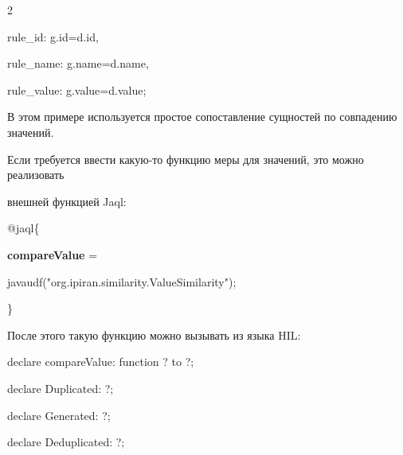 \begin{multicols}{2}
{\noindent

    \hspace*{3pt}rule\_id: g.id\;=\;d.id,



\noindent

    \hspace*{3pt}rule\_name: g.name\;=\;d.name,



\noindent

    \hspace*{3pt}rule\_value: g.value\;=\;d.value;

    }



  В этом примере используется простое сопо\-став\-ле\-ние сущностей по совпадению значений.

Если требуется ввести какую-то функцию меры для значений, это можно реализовать

внешней функцией Jaql:

{\sf



\noindent

  @jaql\{



\noindent

  {\textbf{compareValue}} =



  javaudf("org.ipiran.similarity.ValueSimilarity");



\noindent

  \}

  }



  После этого такую функцию можно вызывать из языка HIL:



{\sf

\noindent

  declare compareValue: function ? to ?;



\noindent

  declare Duplicated: ?;



\noindent

  declare Generated: ?;



\noindent

  declare Deduplicated: ?;



  \vspace*{6pt}



}
\end{multicols}
